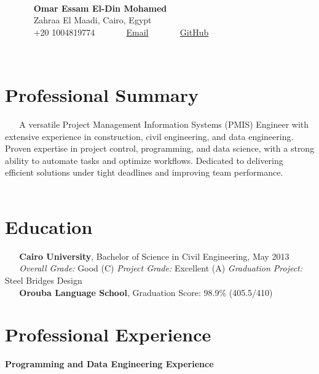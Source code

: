 \documentclass[10pt, letterpaper]{article}
\begin{document}
    \begin{center}
        {\LARGE \textbf{Omar Essam El-Din Mohamed}} \\
        {Zahraa El Maadi, Cairo, Egypt} \\
        {\faPhone* \hspace{0.2cm} +20 1004819774} \hspace{1cm}
        {\href{mailto:eng.omar.e@gmail.com}{\faEnvelope[regular] \hspace{0.2cm} Email}} \hspace{1cm}
        {\href{https://github.com/omare32}{\faGithub \hspace{0.2cm} GitHub}}
    \end{center}
    
    \section{Professional Summary}
    A versatile Project Management Information Systems (PMIS) Engineer with extensive experience in construction, civil engineering, and data engineering. Proven expertise in project control, programming, and data science, with a strong ability to automate tasks and optimize workflows. Dedicated to delivering efficient solutions under tight deadlines and improving team performance.
    
    \section{Education}
    \textbf{Cairo University}, Bachelor of Science in Civil Engineering, May 2013 \\
    \textit{Overall Grade:} Good (C) \hspace{1cm} \textit{Project Grade:} Excellent (A) \hspace{1cm} \textit{Graduation Project:} Steel Bridges Design \\
    \textbf{Orouba Language School}, Graduation Score: 98.9\% (405.5/410)
    
    \section{Professional Experience}
\textbf{Programming and Data Engineering Experience}
\end{document}
